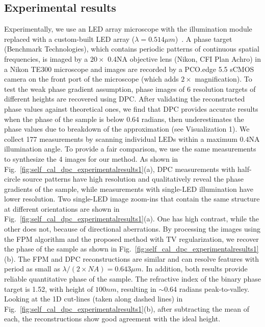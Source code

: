 \subsection{Experimental results}

Experimentally, we use an LED array microscope with the illumination module replaced with a custom-built LED array ($\lambda = 0.514\mu m$)~\cite{tian2015quantitative, tian2015computational}. A phase target (Benchmark Technologies), which contains periodic patterns of continuous spatial frequencies, is imaged by a $20\times$ $0.4 \mathrm{NA}$ objective lens (Nikon, CFI Plan Achro) in a Nikon TE300 microscope and images are recorded by a PCO.edge 5.5 sCMOS camera on the front port of the microscope (which adds $2\times$ magnification). To test the weak phase gradient assumption, phase images of 6 resolution targets of different heights are recovered using DPC. After validating the reconstructed phase values against theoretical ones, we find that DPC provides accurate results when the phase of the sample is below $0.64$ radians, then underestimates the phase values due to breakdown of the approximation (see Visualization 1). We collect 177 measurements by scanning individual LEDs within a maximum $0.4 \mathrm{NA}$ illumination angle. To provide a fair comparison, we use the same measurements to synthesize the 4 images for our method. As shown in Fig.~\ref{fig:self_cal_dpc_experimentalresults1}(a), DPC measurements with half-circle source patterns have high resolution and qualitatively reveal the phase gradients of the sample, while measurements with single-LED illumination have lower resolution. Two single-LED image zoom-ins that contain the same structure at different orientations are shown in Fig.~\ref{fig:self_cal_dpc_experimentalresults1}(a). One has high contrast, while the other does not, because of directional aberrations. By processing the images using the FPM algorithm and the proposed method with TV regularization, we recover the phase of the sample as shown in Fig.~\ref{fig:self_cal_dpc_experimentalresults1}(b). The FPM and DPC reconstructions are similar and can resolve features with period as small as $\lambda/\left(2\times NA\right) = 0.643\mu m$. In addition, both results provide reliable quantitative phase of the sample. The refractive index of the binary phase target is 1.52, with height of $100 nm$, resulting in $\sim$0.64 radians peak-to-valley. Looking at the 1D cut-lines (taken along dashed lines) in Fig.~\ref{fig:self_cal_dpc_experimentalresults1}(b), after subtracting the mean of each, the reconstructions show good agreement with the ideal height.

